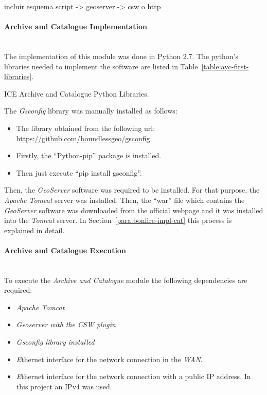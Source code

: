 incluir esquema script -> geoserver -> csw o http

\paragraph{Archive and Catalogue Implementation}~\\

The implementation of this module was done in Python 2.7. The python's libraries
needed to implement the software are listed in
Table~\ref{table:ayc-first-libraries}.

\begin{table}[hp]
  \centering
  {\small
  
  }
  \caption{ICE Archive and Catalogue Python Libraries.}
  \label{table:ayc-first-libraries}
\end{table}

The \emph{Gsconfig} library was manually installed as follows:
\begin{itemize}
\item The library obtained from the following url: \url{https://github.com/boundlessgeo/gsconfig}.
\item Firstly, the ``Python-pip''  package is installed.
\item Then just execute ``pip install gsconfig''.
\end{itemize}

Then, the \emph{GeoServer} software was required to be installed. For that purpose, the
\emph{Apache Tomcat} server was installed. Then, the ``war''
file which contains the \emph{GeoServer} software was downloaded from the official webpage and
it was installed into the \emph{Tomcat} server. In Section~\ref{para:bonfire-impl-cat} this process
is explained in detail. 

\paragraph{Archive and Catalogue Execution}~\\

To execute the \emph{Archive and Catalogue} module the following dependencies
are required:
\begin{itemize}
\item \emph{Apache Tomcat}
\item \emph{Geoserver with the \ac{CSW} plugin}
\item \emph{Gsconfig library installed}
\item \emph Ethernet interface for the network connection in the \bonfire
  \emph{WAN}.
\item \emph Ethernet interface for the network connection with a public \ac{IP}
  address. In this project an \ac{IP}v4 was used.
\end{itemize}


